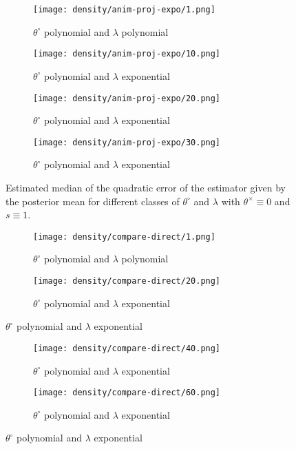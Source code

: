 \begin{figure}
\centering
\begin{subfigure}{.5\textwidth}
  \centering
  \texttt{[image: density/anim-proj-expo/1.png]}
  \caption{$\theta^{\circ}$ polynomial and $\lambda$ polynomial}
  \label{fig3:sub1}
\end{subfigure}%
\begin{subfigure}{.5\textwidth}
  \centering
  \texttt{[image: density/anim-proj-expo/10.png]}
  \caption{$\theta^{\circ}$ polynomial and $\lambda$ exponential}
  \label{fig3:sub2}
\end{subfigure}
\begin{subfigure}{.4\textwidth}
  \centering
  \texttt{[image: density/anim-proj-expo/20.png]}
  \caption{$\theta^{\circ}$ polynomial and $\lambda$ exponential}
  \label{fig3:sub2}
\end{subfigure}
\begin{subfigure}{.4\textwidth}
  \centering
  \texttt{[image: density/anim-proj-expo/30.png]}
  \caption{$\theta^{\circ}$ polynomial and $\lambda$ exponential}
  \label{fig3:sub2}
\end{subfigure}
\caption{Estimated median of the quadratic error of the estimator given by the posterior mean for different classes of $\theta^{\circ}$ and $\lambda$ with $\theta^{\times} \equiv 0$ and $s \equiv 1$.}
\label{EQM}
\end{figure}





\begin{figure}
\centering
\begin{subfigure}{.7\textwidth}
  \centering
  \texttt{[image: density/compare-direct/1.png]}
  \caption{$\theta^{\circ}$ polynomial and $\lambda$ polynomial}
  \label{fig3:sub1}
\end{subfigure}%

\begin{subfigure}{.7\textwidth}
  \centering
  \texttt{[image: density/compare-direct/20.png]}
  \caption{$\theta^{\circ}$ polynomial and $\lambda$ exponential}
  \label{fig3:sub2}
\end{subfigure}
\end{figure}

\begin{figure}\ContinuedFloat
\begin{subfigure}{.7\textwidth}
  \centering
  \texttt{[image: density/compare-direct/40.png]}
  \caption{$\theta^{\circ}$ polynomial and $\lambda$ exponential}
  \label{fig3:sub2}
\end{subfigure}

\begin{subfigure}{.7\textwidth}
  \centering
  \texttt{[image: density/compare-direct/60.png]}
  \caption{$\theta^{\circ}$ polynomial and $\lambda$ exponential}
  \label{fig3:sub2}
\end{subfigure}
\end{figure}

